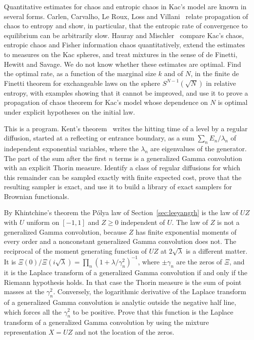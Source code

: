 \begin{problem}[Axioms]\label{prob:axioms}%
Quantitative estimates for chaos and entropic chaos in Kac's model are known in several forms. Carlen, Carvalho, Le Roux, Loss and Villani~\cite{cclv2010} relate propagation of chaos to entropy and show, in particular, that the entropic rate of convergence to equilibrium can be arbitrarily slow. Hauray and Mischler~\cite{hauraymischler2014} compare Kac's chaos, entropic chaos and Fisher information chaos quantitatively, extend the estimates to measures on the Kac spheres, and treat mixtures in the sense of de Finetti, Hewitt and Savage. We do not know whether these estimates are optimal. Find the optimal rate, as a function of the marginal size $k$ and of $N$, in the finite de Finetti theorem for exchangeable laws on the sphere $S^{N-1}(\sqrt N)$ in relative entropy, with examples showing that it cannot be improved, and use it to prove a propagation of chaos theorem for Kac's model whose dependence on $N$ is optimal under explicit hypotheses on the initial law.
\end{problem}

\begin{problem}
\label{prob:yor}
This is a program. Kent's theorem~\cite{kent1980} writes the hitting time of a level by a regular diffusion, started at a reflecting or entrance boundary, as a sum $\sum_nE_n/\lambda_n$ of independent exponential variables, where the $\lambda_n$ are eigenvalues of the generator. The part of the sum after the first $n$ terms is a generalized Gamma convolution with an explicit Thorin measure. Identify a class of regular diffusions for which this remainder can be sampled exactly with finite expected cost, prove that the resulting sampler is exact, and use it to build a library of exact samplers for Brownian functionals.
\end{problem}

\begin{problem}[Mixtures]\label{prob:mixtures}%
By Khintchine's theorem the P\'olya law of Section~\ref{sec:leeyangrh} is the law of $UZ$ with $U$ uniform on $[-1,1]$ and $Z\geq0$ independent of $U$. The law of $Z$ is not a generalized Gamma convolution, because $Z$ has finite exponential moments of every order and a nonconstant generalized Gamma convolution does not. The reciprocal of the moment generating function of $UZ$ at $2\sqrt\lambda$ is a different matter. It is $\Xi(0)/\Xi(i\sqrt\lambda) = \prod_n(1+\lambda/\gamma_n^2)^{-1}$, where $\pm\gamma_n$ are the zeros of $\Xi$, and it is the Laplace transform of a generalized Gamma convolution if and only if the Riemann hypothesis holds. In that case the Thorin measure is the sum of point masses at the $\gamma_n^2$. Conversely, the logarithmic derivative of the Laplace transform of a generalized Gamma convolution is analytic outside the negative half line, which forces all the $\gamma_n^2$ to be positive. Prove that this function is the Laplace transform of a generalized Gamma convolution by using the mixture representation $X = UZ$ and not the location of the zeros.
\end{problem}

